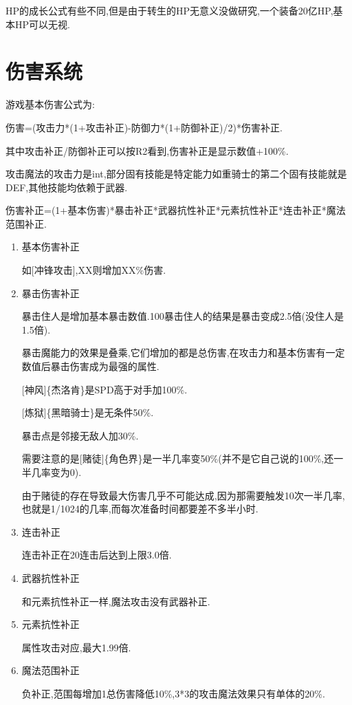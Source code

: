 	HP的成长公式有些不同,但是由于转生的HP无意义没做研究,一个装备20亿HP,基本HP可以无视.

	\newpage

	\section{伤害系统}
	
	游戏基本伤害公式为:

	伤害=(攻击力*(1+攻击补正)-防御力*(1+防御补正)/2)*伤害补正.

	其中攻击补正/防御补正可以按R2看到,伤害补正是显示数值+100\%.

	攻击魔法的攻击力是int,部分固有技能是特定能力如重骑士的第二个固有技能就是DEF,其他技能均依赖于武器.

	伤害补正=(1+基本伤害)*暴击补正*武器抗性补正*元素抗性补正*连击补正*魔法范围补正.

	\begin{enumerate}

		\item 基本伤害补正

		如[冲锋攻击],XX则增加XX\%伤害.

		\item 暴击伤害补正

		暴击住人是增加基本暴击数值.100暴击住人的结果是暴击变成2.5倍(没住人是1.5倍).

		暴击魔能力的效果是叠乘,它们增加的都是总伤害,在攻击力和基本伤害有一定数值后暴击伤害成为最强的属性.

		[神风]\{杰洛肯\}是SPD高于对手加100\%.

		[炼狱]\{黑暗骑士\}是无条件50\%.

		暴击点是邻接无敌人加30\%.

		需要注意的是[赌徒]\{角色界\}是一半几率变50\%(并不是它自己说的100\%,还一半几率变为0).

		由于赌徒的存在导致最大伤害几乎不可能达成,因为那需要触发10次一半几率,也就是1/1024的几率,而每次准备时间都要差不多半小时.

		\item 连击补正
		
		连击补正在20连击后达到上限3.0倍.

		\item 武器抗性补正

		和元素抗性补正一样,魔法攻击没有武器补正.

		\item 元素抗性补正
		
		属性攻击对应,最大1.99倍.

		\item 魔法范围补正
		
		负补正,范围每增加1总伤害降低10\%,3*3的攻击魔法效果只有单体的20\%.

	\end{enumerate}

